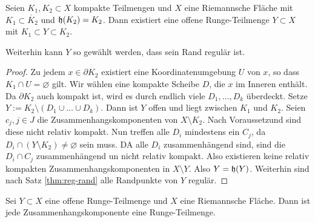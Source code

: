 \begin{lemma}
  \label{lemma:zwischen-runge}
  Seien $K_1, K_2 \subset X$ kompakte Teilmengen und $X$ eine
  Riemannsche Fläche mit $K_1 \subset \mathring{K_2}$ und $\mathfrak{h}(K_2)
  = K_2$.
  Dann existiert eine offene Runge-Teilmenge $Y \subset X$ mit $K_1
  \subset Y \subset K_2$.

  Weiterhin kann $Y$ so gewählt werden, dass sein Rand regulär ist.
\end{lemma}

\begin{proof}
  Zu jedem $x \in \partial K_2$ existiert eine Koordinatenumgebung $U$
  von $x$, so dass $K_1 \cap U = \varnothing$ gilt. Wir wählen eine kompakte
  Scheibe $D$, die $x$ im Inneren enthält. Da $\partial K_2$ auch
  kompakt ist, wird es durch endlich viele $D_1, \dots, D_k$
  überdeckt. Setze $Y := K_2 \setminus (D_1 \cup \dots \cup D_k)$. 
  Dann ist $Y$ offen und liegt zwischen $K_1$ und $K_2$. 
  Seien $c_j, j \in J$ die Zusammenhangskomponenten von $X \setminus
  K_2$. Nach Voraussetzund sind diese nicht relativ kompakt. Nun
  treffen alle $D_i$ mindestens ein $C_j$, da $D_i \cap (Y \setminus
  K_2) \neq \varnothing$ sein muss. DA alle $D_i$ zusammenhängend
  sind, sind die $D_i \cap C_j$ zusammenhängend un nicht relativ
  kompakt. Also existieren keine relativ kompakten
  Zusammenhangskomponenten in $X\setminus Y$. Also $Y = \mathfrak{h}(Y)$.
  Weiterhin sind nach Satz \ref{thm:reg-rand} alle Randpunkte von $Y$ regulär.
\end{proof}


\begin{thm}
  \label{thm:runge-zshkomp}
  Sei $Y \subset X$ eine offene Runge-Teilmenge und $X$ eine
  Riemannsche Fläche. 
  Dann ist jede Zusammenhangskomponente eine Runge-Teilmenge.
\end{thm}

